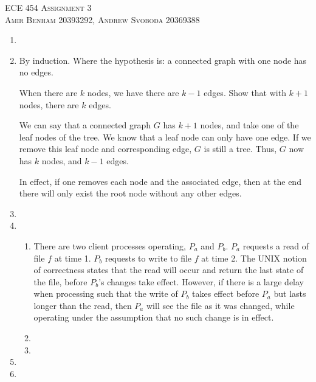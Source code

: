 \documentclass{article}
\begin{document}
\begin{center}
\textsc{\Large ECE 454 Assignment 3}\\[0.5cm]
\textsc{Amir Benham 20393292, Andrew Svoboda 20369388}\\[0.5cm]
\end{center}

\begin{enumerate}

	\item 

	\item 
	By induction. Where the hypothesis is: a connected graph with one node has no edges.
	
	When there are \(k\) nodes, we have there are \(k-1\) edges. Show that with \(k+1\) nodes, there are \(k\) edges. 

	We can say that a connected graph \(G\) has \(k+1\) nodes, and take one of the leaf nodes of the tree. We know that a leaf node can only have one edge. If we remove this leaf node and corresponding edge, \(G\) is still a tree. Thus, \(G\) now has \(k\) nodes, and \(k - 1\) edges.

	In effect, if one removes each node and the associated edge, then at the end there will only exist the root node without any other edges. 

	\item 


	\item 

	\begin{enumerate}
		\item There are two client processes operating, \(P_a\) and \(P_b\). \(P_a\) requests a read of file \(f\) at time 1.  \(P_b\) requests to write to file \(f\) at time 2. The UNIX notion of correctness states that the read will occur and return the last state of the file, before \(P_b\)'s changes take effect. However, if there is a large delay when processing such that the write of \(P_b\) takes effect before \(P_a\) but lasts longer than the read, then \(P_a\) will see the file as it was changed, while operating under the assumption that no such change is in effect.

		\item

		\item
	\end{enumerate}

	\item 

	\item 
\end{enumerate}
\end{document}
